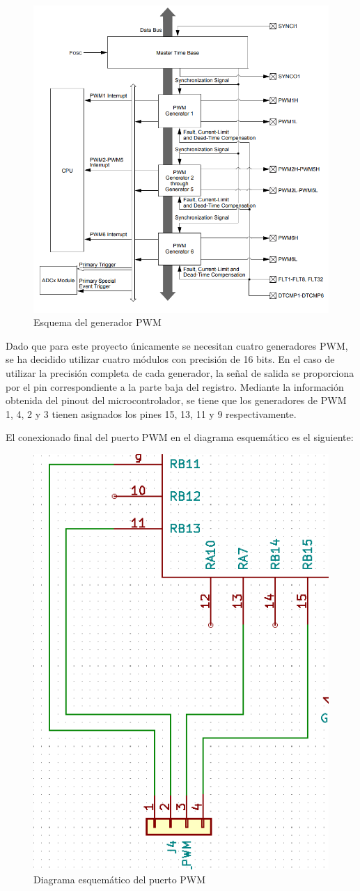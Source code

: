 \begin{itemize}
    \begin{figure}[H]
    \centering 
    \includegraphics[width=.6\linewidth]{pictures/PWMdatasheet.PNG}
    \caption{Esquema del generador PWM}
    \label{fig:kdiagram}
    \end{figure}
    
    Dado que para este proyecto únicamente se necesitan cuatro generadores PWM, se ha decidido utilizar cuatro módulos con precisión de 16 bits. En el caso de utilizar la precisión completa de cada generador, la señal de salida se proporciona por el pin correspondiente a la parte baja del registro. Mediante la información obtenida del pinout del microcontrolador, se tiene que los generadores de PWM 1, 4, 2 y 3 tienen asignados los pines 15, 13, 11 y 9 respectivamente.
    
    El conexionado final del puerto PWM en el diagrama esquemático es el siguiente:
    
    \begin{figure}[H]
    \centering 
    \includegraphics[width=.45\linewidth]{pictures/PWM.PNG}
    \caption{Diagrama esquemático del puerto PWM}
    \label{fig:kdiagram}
    \end{figure}


\end{itemize}

